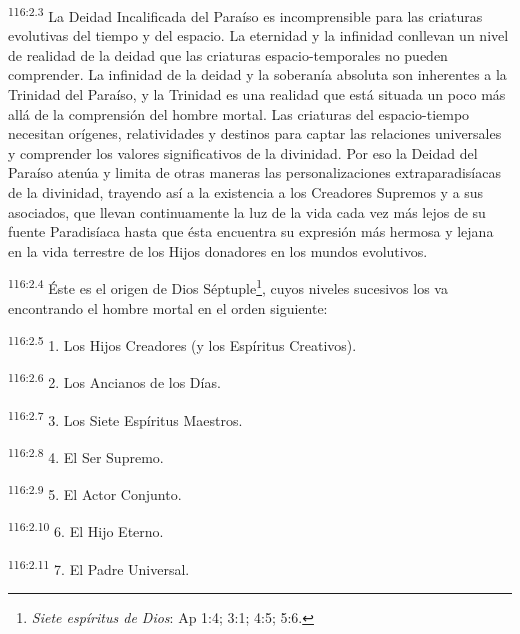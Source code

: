 \par
\textsuperscript{116:2.3} La Deidad Incalificada del Paraíso es incomprensible para las criaturas evolutivas del tiempo y del espacio. La eternidad y la infinidad conllevan un nivel de realidad de la deidad que las criaturas espacio-temporales no pueden comprender. La infinidad de la deidad y la soberanía absoluta son inherentes a la Trinidad del Paraíso, y la Trinidad es una realidad que está situada un poco más allá de la comprensión del hombre mortal. Las criaturas del espacio-tiempo necesitan orígenes, relatividades y destinos para captar las relaciones universales y comprender los valores significativos de la divinidad. Por eso la Deidad del Paraíso atenúa y limita de otras maneras las personalizaciones extraparadisíacas de la divinidad, trayendo así a la existencia a los Creadores Supremos y a sus asociados, que llevan continuamente la luz de la vida cada vez más lejos de su fuente Paradisíaca hasta que ésta encuentra su expresión más hermosa y lejana en la vida terrestre de los Hijos donadores en los mundos evolutivos.

\par
\textsuperscript{116:2.4} Éste es el origen de Dios Séptuple\footnote{\textit{Siete espíritus de Dios}: Ap 1:4; 3:1; 4:5; 5:6.}, cuyos niveles sucesivos los va encontrando el hombre mortal en el orden siguiente:

\par
\textsuperscript{116:2.5} 1. Los Hijos Creadores (y los Espíritus Creativos).

\par
\textsuperscript{116:2.6} 2. Los Ancianos de los Días.

\par
\textsuperscript{116:2.7} 3. Los Siete Espíritus Maestros.

\par
\textsuperscript{116:2.8} 4. El Ser Supremo.

\par
\textsuperscript{116:2.9} 5. El Actor Conjunto.

\par
\textsuperscript{116:2.10} 6. El Hijo Eterno.

\par
\textsuperscript{116:2.11} 7. El Padre Universal.

